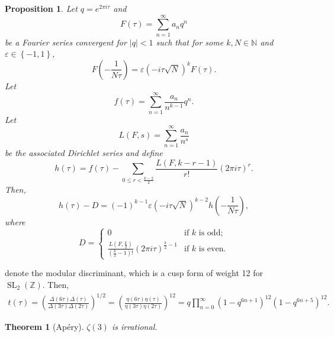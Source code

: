 \documentclass[10pt,a4paper]{amsart}
\newtheorem{proposition}{Proposition}
\newtheorem{theorem}{Theorem}
\begin{document}
\begin{proposition}\label{prop: h formula in terms of d}
Let $q=e^{2\pi i\tau}$ and \[F\left(\tau\right)=\sum_{n=1}^{\infty}a_nq^n\] be a Fourier series convergent for $\left|q\right|<1$ such that for some $k,N\in\mathbb{N}$ and $\varepsilon\in\left\{-1,1\right\}$, \[F\left(-\frac{1}{N\tau}\right)=\varepsilon\left(-i\tau\sqrt{N}\right)^kF\left(\tau\right).\] Let \[f\left(\tau\right)=\sum_{n=1}^{\infty}\frac{a_n}{n^{k-1}}q^n.\] Let \[L\left(F,s\right)=\sum_{n=1}^{\infty}\frac{a_n}{n^s}\] be the associated Dirichlet series and define \[h\left(\tau\right)=f\left(\tau\right)-\sum_{0\le r<\frac{k-2}{2}}\frac{L\left(F,k-r-1\right)}{r!}\left(2\pi i\tau\right)^r.\] Then, \[h\left(\tau\right)-D=\left(-1\right)^{k-1}\varepsilon\left(-i\tau\sqrt{N}\right)^{k-2}h\left(-\frac{1}{N\tau}\right),\] where \[D=\begin{cases}0&\text{if $k$ is odd};\\[4pt]\displaystyle\frac{L\left(F,\frac{k}{2}\right)}{\left(\frac{k}{2}-1\right)!}\left(2\pi i\tau\right)^{\frac{k}{2}-1}&\text{if $k$ is even}.\end{cases}\]
\end{proposition}

denote the modular discriminant, which is a cusp form of weight 12 for $\operatorname{SL}_2\left(\mathbb{Z}\right)$. Then, \begin{align}\label{eqn: beukers formula for t}
t\left(\tau\right)=\left(\frac{\Delta\left(6\tau\right)\Delta\left(\tau\right)}{\Delta\left(3\tau\right)\Delta\left(2\tau\right)}\right)^{1/2}=\left(\frac{\eta\left(6\tau\right)\eta\left(\tau\right)}{\eta\left(3\tau\right)\eta\left(2\tau\right)}\right)^{12}=q\prod_{n=0}^{\infty}\left(1-q^{6n+1}\right)^{12}\left(1-q^{6n+5}\right)^{12}.
\end{align}

\begin{theorem}[Apéry]
$\zeta\left(3\right)$ is irrational.
\end{theorem}
\end{document}
